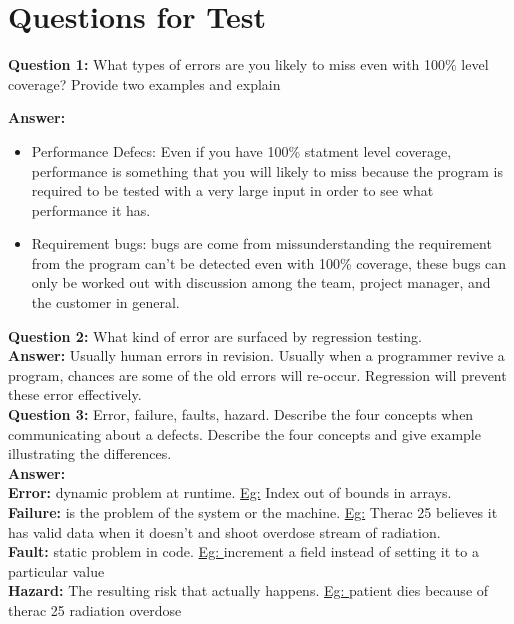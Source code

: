 \documentclass{article}
\begin{document}
\section{Questions for Test}

\textbf{Question 1:}
What types of errors are you likely to miss even with 100\%  level
coverage? Provide two examples and explain

\textbf{Answer:}
\begin{itemize}
  \item Performance Defecs: Even if you have 100\% statment level coverage,
  performance is something that you will likely to miss because the program is
  required to be tested with a very large input in order to see what performance
  it has.
  \item Requirement bugs: bugs are come from missunderstanding the requirement
  from the program can't be detected even with 100\% coverage, these bugs can
  only be worked out with discussion among the team, project manager, and the
  customer in general.
\end{itemize}

\textbf{Question 2:} What kind of error are surfaced by regression testing.\\
\textbf{Answer:} Usually human errors in revision. Usually when a programmer
revive a program, chances are some of the old errors will re-occur. Regression
will prevent these error effectively.\\


\textbf{Question 3:} Error, failure, faults, hazard. Describe the four concepts
when communicating about a defects. Describe the four concepts and give example
illustrating the differences. \\
\textbf{Answer:}\\
\textbf{Error:} dynamic problem at runtime. \underline{ Eg:} Index out of bounds
in arrays.\\
\textbf{Failure:} is the problem of the system or the machine. \underline{ Eg:}
Therac 25 believes it has valid data when it doesn't and shoot overdose stream
of radiation.\\
\textbf{Fault:} static problem in code. \underline{Eg: } increment a field
instead of setting it to a particular value\\
\textbf{ Hazard: } The resulting risk that actually happens. \underline{Eg: }
patient dies because of therac 25 radiation overdose\\
\end{document}
